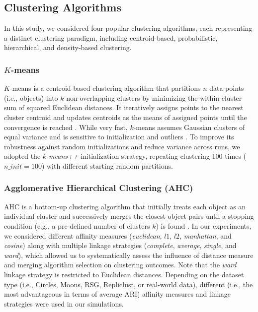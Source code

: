 \documentclass[preprint,12pt]{elsarticle}
\begin{document}
\subsection{Clustering Algorithms} \label{subsec:clust_alg}

In this study, we considered four popular clustering algorithms, each representing a distinct clustering paradigm, including centroid-based, probabilistic, hierarchical, and density-based clustering.

\subsubsection{$K$-means} $K$-means is a centroid-based clustering algorithm that partitions \(n\) data points (i.e., objects) into \(k\) non-overlapping clusters by minimizing the within-cluster sum of squared Euclidean distances. It iteratively assigns points to the nearest cluster centroid and updates centroids as the means of assigned points until the convergence is reached \cite{macqueen1967some}. While very fast, $k$-means assumes Gaussian clusters of equal variance and is sensitive to initialization and outliers \cite{de2023k,de2016applying,PENA19991027,de2026improving}. To improve its robustness against random initializations and reduce variance across runs, we adopted the \textit{$k$-means++} initialization strategy, repeating clustering 100 times ($n\_init = 100$) with different starting random partitions.
\subsubsection{Agglomerative Hierarchical Clustering (AHC)} 
AHC is a bottom-up clustering algorithm that initially treats each object as an individual cluster and successively merges the closest object pairs until a stopping condition (e.g., a pre-defined number of clusters \(k\)) is found \cite{sokal1963numerical}. In our experiments, we considered different affinity measures (\textit{euclidean}, $l1$, $l2$, \textit{manhattan}, and \textit{cosine}) along with multiple linkage strategies (\textit{complete}, \textit{average}, \textit{single}, and \textit{ward}), which allowed us to systematically assess the influence of distance measure and merging algorithm selection on clustering outcomes. Note that the \textit{ward} linkage strategy is restricted to Euclidean distances. Depending on the dataset type (i.e., Circles, Moons, RSG, Repliclust, or real-world data), different (i.e., the most advantageous in terms of average ARI) affinity measures and linkage strategies were used in our simulations.
\end{document}
